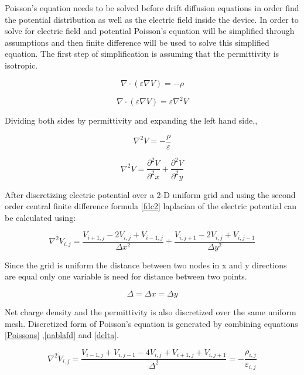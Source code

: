 Poisson's equation needs to be solved before drift diffusion equations in order find the potential distribution as well as the electric field inside the device. In order to solve for electric field and potential Poisson's equation will be simplified through assumptions and then finite difference will be used to solve this simplified equation. The first step of simplification is assuming that the permittivity is isotropic.
 
\begin{equation}
\nabla \cdot  (\varepsilon \nabla V)=-\rho
\end{equation}

\begin{equation}
\nabla \cdot  (\varepsilon \nabla V)=\varepsilon  \nabla^2 V
\end{equation}

Dividing both sides by permittivity and expanding the left hand side,,

\begin{equation}
 \nabla^2 V =-\frac{\rho}{\varepsilon}
 \label{Poissons}
\end{equation}

\begin{equation}
 \nabla^2 V =\frac{\partial^2 V}{\partial^2 x}+\frac{\partial^2 V}{\partial^2 y}
\end{equation}

After discretizing electric potential over a 2-D uniform grid and using the second order central finite difference formula \eqref{fdc2} laplacian of the electric potential can be calculated using:

\begin{equation}
 \nabla^2 V_{i,j}=\frac{V_{i+1,j}-2V_{i,j}+V_{i-1,j}}{\Delta x^2}+\frac{V_{i,j+1}-2V_{i,j}+V_{i,j-1}}{\Delta y^2}
 \label{nablafd}
\end{equation}

Since the grid is uniform the distance between two nodes in x and y directions are equal only one variable is need for distance between two points.

\begin{equation}
\Delta=\Delta x =\Delta y
\label{delta}
\end{equation}

Net charge density and the permittivity is also discretized over the same uniform mesh. Discretized form of Poisson's equation is generated by combining equations \ref{Poissons} ,\ref{nablafd} and \ref{delta}.

\begin{equation}
 \nabla^2 V_{i,j}=\frac{V_{i-1,j}+V_{i,j-1}-4V_{i,j}+V_{i+1,j}+V_{i,j+1}}{\Delta^2}=-\frac{\rho_{i,j}}{\varepsilon_{i,j}}
\end{equation}

